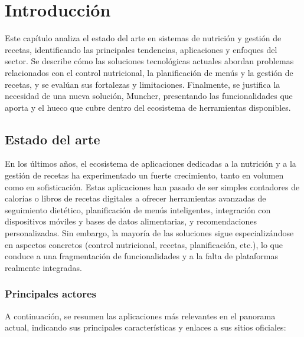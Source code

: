 \section*{Introducción}

Este capítulo analiza el estado del arte en sistemas de nutrición y gestión de recetas, identificando las principales tendencias, aplicaciones y enfoques del sector. Se describe cómo las soluciones tecnológicas actuales abordan problemas relacionados con el control nutricional, la planificación de menús y la gestión de recetas, y se evalúan sus fortalezas y limitaciones. Finalmente, se justifica la necesidad de una nueva solución, Muncher, presentando las funcionalidades que aporta y el hueco que cubre dentro del ecosistema de herramientas disponibles.

\subsection*{Estado del arte}

En los últimos años, el ecosistema de aplicaciones dedicadas a la nutrición y a la gestión de recetas ha experimentado un fuerte crecimiento, tanto en volumen como en sofisticación. Estas aplicaciones han pasado de ser simples contadores de calorías o libros de recetas digitales a ofrecer herramientas avanzadas de seguimiento dietético, planificación de menús inteligentes, integración con dispositivos móviles y bases de datos alimentarias, y recomendaciones personalizadas. Sin embargo, la mayoría de las soluciones sigue especializándose en aspectos concretos (control nutricional, recetas, planificación, etc.), lo que conduce a una fragmentación de funcionalidades y a la falta de plataformas realmente integradas.

\subsubsection*{Principales actores}

A continuación, se resumen las aplicaciones más relevantes en el panorama actual, indicando sus principales características y enlaces a sus sitios oficiales:

